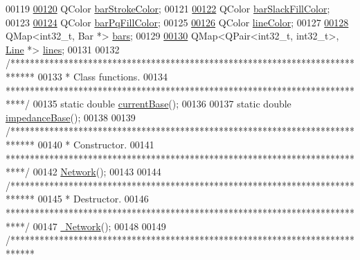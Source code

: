\begin{DoxyCode}
00119 
\hypertarget{network_8h_source_l00120}{}\hyperlink{class_network_ad69052271ab0a9899948815b6201f2c6}{00120}   QColor \hyperlink{class_network_ad69052271ab0a9899948815b6201f2c6}{barStrokeColor};
00121 
\hypertarget{network_8h_source_l00122}{}\hyperlink{class_network_ad78d9a206daf4ba0780067b5043c7f5c}{00122}   QColor \hyperlink{class_network_ad78d9a206daf4ba0780067b5043c7f5c}{barSlackFillColor};
00123 
\hypertarget{network_8h_source_l00124}{}\hyperlink{class_network_a386f492f548ec13f5d0e350c4f2217aa}{00124}   QColor \hyperlink{class_network_a386f492f548ec13f5d0e350c4f2217aa}{barPqFillColor};
00125 
\hypertarget{network_8h_source_l00126}{}\hyperlink{class_network_a453db7f1a994603fe4d38ac5899eb09c}{00126}   QColor \hyperlink{class_network_a453db7f1a994603fe4d38ac5899eb09c}{lineColor};
00127 
\hypertarget{network_8h_source_l00128}{}\hyperlink{class_network_a7fe628f7de34a96235cbd3f2cee4aff2}{00128}   QMap<int32\_t, Bar *> \hyperlink{class_network_a7fe628f7de34a96235cbd3f2cee4aff2}{bars};
00129 
\hypertarget{network_8h_source_l00130}{}\hyperlink{class_network_acda0fd42e712e460a08a0e96511ee7eb}{00130}   QMap<QPair<int32\_t, int32\_t>, \hyperlink{class_line}{Line} *> \hyperlink{class_network_acda0fd42e712e460a08a0e96511ee7eb}{lines};
00131 
00132   \textcolor{comment}{/*****************************************************************************}
00133 \textcolor{comment}{   * Class functions.}
00134 \textcolor{comment}{   ****************************************************************************/}
00135   \textcolor{keyword}{static} \textcolor{keywordtype}{double} \hyperlink{group___graphics_ga433bc5c32cf2ce5329bb40b21952d885}{currentBase}();
00136 
00137   \textcolor{keyword}{static} \textcolor{keywordtype}{double} \hyperlink{group___graphics_gae6794c93d37df113778c37c2c702f6d9}{impedanceBase}();
00138 
00139   \textcolor{comment}{/*****************************************************************************}
00140 \textcolor{comment}{   * Constructor.}
00141 \textcolor{comment}{   ****************************************************************************/}
00142   \hyperlink{group___graphics_ga3cc2fb4f8fa4d507077e8da85ce5a1c8}{Network}();
00143 
00144   \textcolor{comment}{/*****************************************************************************}
00145 \textcolor{comment}{   * Destructor.}
00146 \textcolor{comment}{   ****************************************************************************/}
00147   \hyperlink{group___graphics_ga7a4e19cdb4bf0c7ecf82baa643831492}{~Network}();
00148 
00149   \textcolor{comment}{/*****************************************************************************}

\end{DoxyCode}
